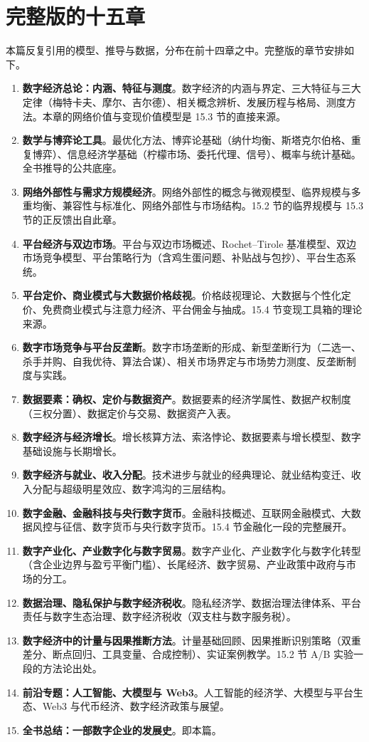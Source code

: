 \section*{完整版的十五章}

本篇反复引用的模型、推导与数据，分布在前十四章之中。完整版的章节安排如下。

\begin{enumerate}
\item \textbf{数字经济总论：内涵、特征与测度}。数字经济的内涵与界定、三大特征与三大定律（梅特卡夫、摩尔、吉尔德）、相关概念辨析、发展历程与格局、测度方法。本章的网络价值与变现价值模型是 15.3 节的直接来源。
\item \textbf{数学与博弈论工具}。最优化方法、博弈论基础（纳什均衡、斯塔克尔伯格、重复博弈）、信息经济学基础（柠檬市场、委托代理、信号）、概率与统计基础。全书推导的公共底座。
\item \textbf{网络外部性与需求方规模经济}。网络外部性的概念与微观模型、临界规模与多重均衡、兼容性与标准化、网络外部性与市场结构。15.2 节的临界规模与 15.3 节的正反馈出自此章。
\item \textbf{平台经济与双边市场}。平台与双边市场概述、Rochet--Tirole 基准模型、双边市场竞争模型、平台策略行为（含鸡生蛋问题、补贴战与包抄）、平台生态系统。
\item \textbf{平台定价、商业模式与大数据价格歧视}。价格歧视理论、大数据与个性化定价、免费商业模式与注意力经济、平台佣金与抽成。15.4 节变现工具箱的理论来源。
\item \textbf{数字市场竞争与平台反垄断}。数字市场垄断的形成、新型垄断行为（二选一、杀手并购、自我优待、算法合谋）、相关市场界定与市场势力测度、反垄断制度与实践。
\item \textbf{数据要素：确权、定价与数据资产}。数据要素的经济学属性、数据产权制度（三权分置）、数据定价与交易、数据资产入表。
\item \textbf{数字经济与经济增长}。增长核算方法、索洛悖论、数据要素与增长模型、数字基础设施与长期增长。
\item \textbf{数字经济与就业、收入分配}。技术进步与就业的经典理论、就业结构变迁、收入分配与超级明星效应、数字鸿沟的三层结构。
\item \textbf{数字金融、金融科技与央行数字货币}。金融科技概述、互联网金融模式、大数据风控与征信、数字货币与央行数字货币。15.4 节金融化一段的完整展开。
\item \textbf{数字产业化、产业数字化与数字贸易}。数字产业化、产业数字化与数字化转型（含企业边界与盈亏平衡门槛）、长尾经济、数字贸易、产业政策中政府与市场的分工。
\item \textbf{数据治理、隐私保护与数字经济税收}。隐私经济学、数据治理法律体系、平台责任与数字生态治理、数字经济税收（双支柱与数字服务税）。
\item \textbf{数字经济中的计量与因果推断方法}。计量基础回顾、因果推断识别策略（双重差分、断点回归、工具变量、合成控制）、实证案例教学。15.2 节 A/B 实验一段的方法论出处。
\item \textbf{前沿专题：人工智能、大模型与 Web3}。人工智能的经济学、大模型与平台生态、Web3 与代币经济、数字经济政策与展望。
\item \textbf{全书总结：一部数字企业的发展史}。即本篇。
\end{enumerate}
